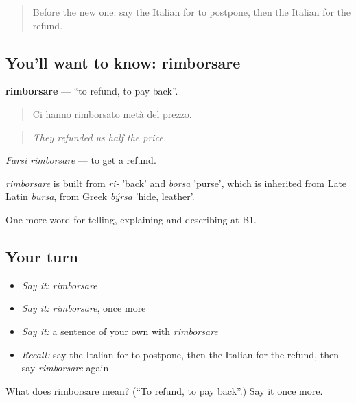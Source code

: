 \label{lesson:IT-C420-rimborsare}



\begin{quote}
Before the new one: say the Italian for to postpone, then the Italian for the refund.
\end{quote}

\subsection*{You'll want to know: rimborsare}
\textbf{rimborsare} — \textquotedblleft{}to refund, to pay back\textquotedblright{}.

\begin{quote}
Ci hanno rimborsato metà del prezzo.
\end{quote}

\begin{quote}
\emph{They refunded us half the price.}
\end{quote}

\emph{Farsi rimborsare} — to get a refund.

\begin{cousinweb}
\emph{rimborsare} is built from \emph{ri-} 'back' and \emph{borsa} 'purse', which is inherited from Late Latin \emph{bursa}, from Greek \emph{býrsa} 'hide, leather'.
\end{cousinweb}

\begin{grammarlens}[title={What you've built}]
One more word for telling, explaining and describing at B1.
\end{grammarlens}

\subsection*{Your turn}
\begin{itemize}
\raggedright
  \item \emph{Say it:} \emph{rimborsare}
  \item \emph{Say it:} \emph{rimborsare}, once more
  \item \emph{Say it:} a sentence of your own with \emph{rimborsare}
  \item \emph{Recall:} say the Italian for to postpone, then the Italian for the refund, then say \emph{rimborsare} again
\end{itemize}

\begin{tcolorbox}[breakable,colback=teal!4,colframe=teal!35!black,title={Before you move on}]
What does rimborsare mean? (\textquotedblleft{}To refund, to pay back\textquotedblright{}.) Say it once more.
\end{tcolorbox}

